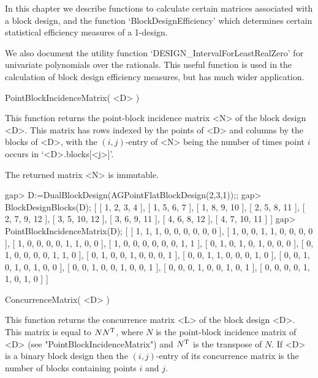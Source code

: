 %
%
%
%
\def\DESIGN{\sf DESIGN}
\def\GRAPE{\sf GRAPE}
\def\nauty{\it nauty}
\def\Aut{{\rm Aut}\,}
\def\x{\times}

In this chapter we describe functions to calculate certain matrices
associated with a block design, and the function `BlockDesignEfficiency'
which determines certain statistical efficiency measures of a 1-design.

We also document the utility function `DESIGN_IntervalForLeastRealZero'
for univariate polynomials over the rationals. This useful function is
used in the calculation of block design efficiency measures, but has
much wider application.


\>PointBlockIncidenceMatrix( <D> )

This function returns the point-block incidence matrix <N> of the
block design <D>.  This matrix has rows indexed by the points of <D>
and columns by the blocks of <D>, with the $(i,j)$-entry of <N> being
the number of times point $i$ occurs in `<D>.blocks[<j>]'.

The returned matrix <N> is immutable. 

\beginexample
gap> D:=DualBlockDesign(AGPointFlatBlockDesign(2,3,1));;
gap> BlockDesignBlocks(D);
[ [ 1, 2, 3, 4 ], [ 1, 5, 6, 7 ], [ 1, 8, 9, 10 ], [ 2, 5, 8, 11 ], 
  [ 2, 7, 9, 12 ], [ 3, 5, 10, 12 ], [ 3, 6, 9, 11 ], [ 4, 6, 8, 12 ], 
  [ 4, 7, 10, 11 ] ]
gap> PointBlockIncidenceMatrix(D);
[ [ 1, 1, 1, 0, 0, 0, 0, 0, 0 ], [ 1, 0, 0, 1, 1, 0, 0, 0, 0 ], 
  [ 1, 0, 0, 0, 0, 1, 1, 0, 0 ], [ 1, 0, 0, 0, 0, 0, 0, 1, 1 ], 
  [ 0, 1, 0, 1, 0, 1, 0, 0, 0 ], [ 0, 1, 0, 0, 0, 0, 1, 1, 0 ], 
  [ 0, 1, 0, 0, 1, 0, 0, 0, 1 ], [ 0, 0, 1, 1, 0, 0, 0, 1, 0 ], 
  [ 0, 0, 1, 0, 1, 0, 1, 0, 0 ], [ 0, 0, 1, 0, 0, 1, 0, 0, 1 ], 
  [ 0, 0, 0, 1, 0, 0, 1, 0, 1 ], [ 0, 0, 0, 0, 1, 1, 0, 1, 0 ] ]
\endexample

\>ConcurrenceMatrix( <D> )

This function returns the concurrence matrix <L> of the block design <D>.
This matrix is equal to $NN^{\rm T}$, where $N$ is the point-block
incidence matrix of <D> (see "PointBlockIncidenceMatrix") and 
$N^{\rm T}$ is the transpose of $N$. If <D> is a binary block design
then the $(i,j)$-entry of its concurrence matrix is the number of blocks
containing points $i$ and $j$.

